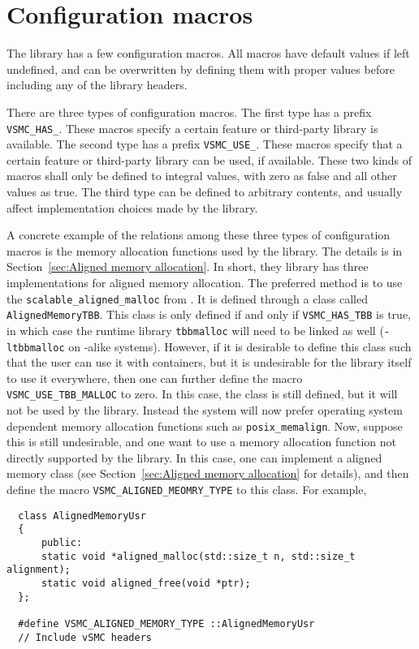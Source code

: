 \chapter{Configuration macros}
\label{chap:Configuration macros}

The library has a few configuration macros. All macros have default values if
left undefined, and can be overwritten by defining them with proper values
before including any of the library headers.

There are three types of configuration macros. The first type has a prefix
\verb|VSMC_HAS_|. These macros specify a certain feature or third-party library
is available. The second type has a prefix \verb|VSMC_USE_|. These macros
specify that a certain feature or third-party library can be used, if
available. These two kinds of macros shall only be defined to integral values,
with zero as false and all other values as true. The third type can be defined
to arbitrary contents, and usually affect implementation choices made by the
library.

A concrete example of the relations among these three types of configuration
macros is the memory allocation functions used by the library. The details is
in Section~\ref{sec:Aligned memory allocation}. In short, they library has
three implementations for aligned memory allocation. The preferred method is to
use the \verb|scalable_aligned_malloc| from \tbb. It is defined through a class
called \verb|AlignedMemoryTBB|. This class is only defined if and only if
\verb|VSMC_HAS_TBB| is true, in which case the runtime library \verb|tbbmalloc|
will need to be linked as well (\verb|-ltbbmalloc| on \unix-alike systems).
However, if it is desirable to define this class such that the user can use it
with \stl containers, but it is undesirable for the library itself to use it
everywhere, then one can further define the macro \verb|VSMC_USE_TBB_MALLOC| to
zero. In this case, the class is still defined, but it will not be used by the
library. Instead the system will now prefer operating system dependent memory
allocation functions such as \verb|posix_memalign|. Now, suppose this is still
undesirable, and one want to use a memory allocation function not directly
supported by the library. In this case, one can implement a aligned memory
class (see Section~\ref{sec:Aligned memory allocation} for details), and then
define the macro \verb|VSMC_ALIGNED_MEOMRY_TYPE| to this class. For example,
\begin{Verbatim}
  class AlignedMemoryUsr
  {
      public:
      static void *aligned_malloc(std::size_t n, std::size_t alignment);
      static void aligned_free(void *ptr);
  };

  #define VSMC_ALIGNED_MEMORY_TYPE ::AlignedMemoryUsr
  // Include vSMC headers
\end{Verbatim}

